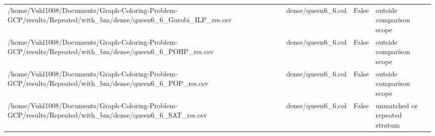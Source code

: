 \begin{table}[htbp]
\begin{tabular}{llll}
/home/Vuhl1008/Documents/Graph-Coloring-Problem-GCP/results/Repeated/with\_bm/dense/queen6\_6\_Gurobi\_ILP\_res.csv & dense/queen6\_6.col & False & outside comparison scope \\
/home/Vuhl1008/Documents/Graph-Coloring-Problem-GCP/results/Repeated/with\_bm/dense/queen6\_6\_POHP\_res.csv & dense/queen6\_6.col & False & outside comparison scope \\
/home/Vuhl1008/Documents/Graph-Coloring-Problem-GCP/results/Repeated/with\_bm/dense/queen6\_6\_POP\_res.csv & dense/queen6\_6.col & False & outside comparison scope \\
/home/Vuhl1008/Documents/Graph-Coloring-Problem-GCP/results/Repeated/with\_bm/dense/queen6\_6\_SAT\_res.csv & dense/queen6\_6.col & False & unmatched or repeated stratum \\
\hline
\end{tabular}
\end{table}
